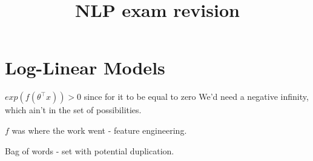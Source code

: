\documentclass{article}
\begin{document}
\title{NLP exam revision}
\maketitle
\section{Log-Linear Models}

	$exp(f(\theta^\top x))>0$ since for it to be equal to zero We'd need a negative infinity, which ain't in the set of possibilities.
	
	$f$ was where the work went - feature engineering.
	
	Bag of words - set with potential duplication.
	
	
\end{document}
